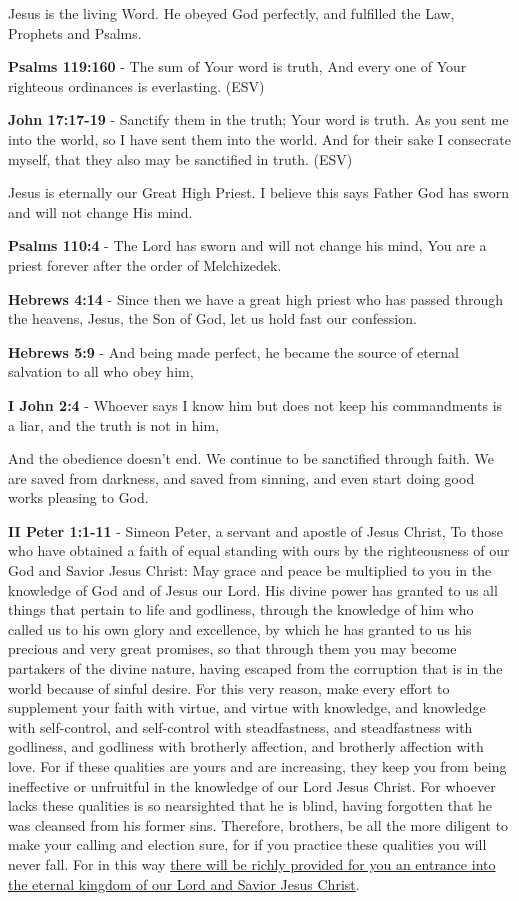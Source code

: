 \documentclass[11pt]{article}
\begin{document}
Jesus is the living Word. He obeyed God perfectly, and fulfilled the Law, Prophets and Psalms.

\textbf{Psalms 119:160} - The sum of Your word is truth, And every one of Your righteous ordinances is everlasting. (ESV)

\textbf{John 17:17-19} - Sanctify them in the truth; Your word is truth. As you sent me into the world, so I have sent them into the world. And for their sake I consecrate myself, that they also may be sanctified in truth.  (ESV)

Jesus is eternally our Great High Priest. I believe this says Father God has sworn and will not change His mind.

\textbf{Psalms 110:4} - The Lord has sworn and will not change his mind, You are a priest forever after the order of Melchizedek.

\textbf{Hebrews 4:14} - Since then we have a great high priest who has passed through the heavens, Jesus, the Son of God, let us hold fast our confession.

\textbf{Hebrews 5:9} - And being made perfect, he became the source of eternal salvation to all who obey him,

\textbf{I John 2:4} - Whoever says I know him but does not keep his commandments is a liar, and the truth is not in him,

And the obedience doesn't end. We continue to be sanctified through faith. We are saved from darkness, and saved from sinning, and even start doing good works pleasing to God.

\textbf{II Peter 1:1-11} - Simeon Peter, a servant and apostle of Jesus Christ, To those who have obtained a faith of equal standing with ours by the righteousness of our God and Savior Jesus Christ: May grace and peace be multiplied to you in the knowledge of God and of Jesus our Lord.  His divine power has granted to us all things that pertain to life and godliness, through the knowledge of him who called us to his own glory and excellence, by which he has granted to us his precious and very great promises, so that through them you may become partakers of the divine nature, having escaped from the corruption that is in the world because of sinful desire.  For this very reason, make every effort to supplement your faith with virtue, and virtue with knowledge, and knowledge with self-control, and self-control with steadfastness, and steadfastness with godliness, and godliness with brotherly affection, and brotherly affection with love.  For if these qualities are yours and are increasing, they keep you from being ineffective or unfruitful in the knowledge of our Lord Jesus Christ.  For whoever lacks these qualities is so nearsighted that he is blind, having forgotten that he was cleansed from his former sins.  Therefore, brothers, be all the more diligent to make your calling and election sure, for if you practice these qualities you will never fall.  For in this way \uline{there will be richly provided for you an entrance into the eternal kingdom of our Lord and Savior Jesus Christ}.
\end{document}
